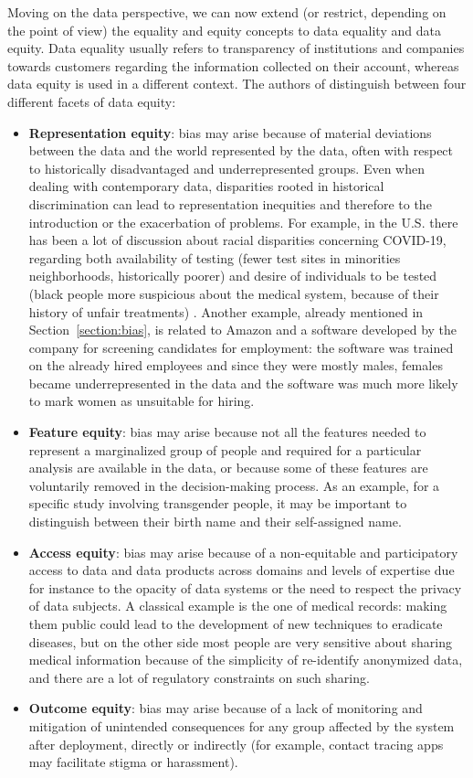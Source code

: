 Moving on the data perspective, we can now extend (or restrict, depending on the point of view) the equality and equity concepts to data equality and data equity. Data equality usually refers to transparency of institutions and companies towards customers regarding the information collected on their account, whereas data equity is used in a different context. The authors of \cite{jagadish2021facets} distinguish between four different facets of data equity:
\begin{itemize}
\item \textbf{Representation equity}: bias may arise because of material deviations between the data and the world represented by the data, often with respect to historically disadvantaged and underrepresented groups. Even when dealing with contemporary data, disparities rooted in historical discrimination can lead to representation inequities and therefore to the introduction or the exacerbation of problems. For example, in the U.S. there has been a lot of discussion about racial disparities concerning COVID-19, regarding both availability of testing (fewer test sites in minorities neighborhoods, historically poorer) and desire of individuals to be tested (black people more suspicious about the medical system, because of their history of unfair treatments) \cite{jagadish2021facets}. Another example, already mentioned in Section~\ref{section:bias}, is related to Amazon and a software developed by the company for screening candidates for employment: the software was trained on the already hired employees and since they were mostly males, females became underrepresented in the data and the software was much more likely to mark women as unsuitable for hiring.
\item \textbf{Feature equity}: bias may arise because not all the features needed to represent a marginalized group of people and required for a particular analysis are available in the data, or because some of these features are voluntarily removed in the decision-making process. As an example, for a specific study involving transgender people, it may be important to distinguish between their birth name and their self-assigned name.
\item \textbf{Access equity}: bias may arise because of a non-equitable and participatory access to data and data products across domains and levels of expertise due for instance to the opacity of data systems or the need to respect the privacy of data subjects. A classical example is the one of medical records: making them public could lead to the development of new techniques to eradicate diseases, but on the other side most people are very sensitive about sharing medical information because of the simplicity of re-identify anonymized data, and there are a lot of regulatory constraints on such sharing.
\item \textbf{Outcome equity}: bias may arise because of a lack of monitoring and mitigation of unintended consequences for any group affected by the system after deployment, directly or indirectly (for example, contact tracing apps may facilitate stigma or harassment).
\end{itemize}


